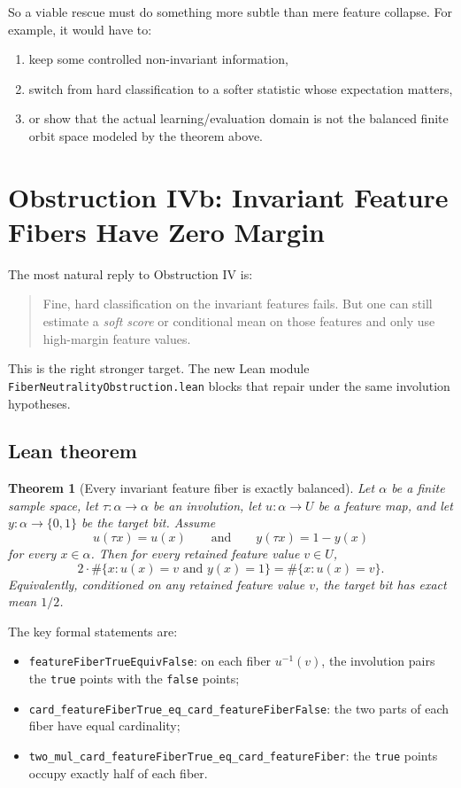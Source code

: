 \documentclass[11pt]{article}
\newtheorem{theorem}{Theorem}[section]
\theoremstyle{remark}
\begin{document}
So a viable rescue must do something more subtle than mere feature collapse.  For example, it
would have to:
\begin{enumerate}[leftmargin=1.5em]
  \item keep some controlled non-invariant information,
  \item switch from hard classification to a softer statistic whose expectation matters,
  \item or show that the actual learning/evaluation domain is not the balanced finite orbit space
  modeled by the theorem above.
\end{enumerate}

\section{Obstruction IVb: Invariant Feature Fibers Have Zero Margin}

The most natural reply to Obstruction IV is:
\begin{quote}
Fine, hard classification on the invariant features fails.  But one can still estimate a
\emph{soft score} or conditional mean on those features and only use high-margin feature values.
\end{quote}

This is the right stronger target.  The new Lean module
\texttt{FiberNeutralityObstruction.lean} blocks that repair under the same involution
hypotheses.

\subsection{Lean theorem}

\begin{theorem}[Every invariant feature fiber is exactly balanced]
Let \(\alpha\) be a finite sample space, let \(\tau : \alpha \to \alpha\) be an involution, let
\(u : \alpha \to U\) be a feature map, and let \(y : \alpha \to \{0,1\}\) be the target bit.
Assume
\[
  u(\tau x) = u(x)
  \qquad\text{and}\qquad
  y(\tau x) = 1 - y(x)
\]
for every \(x \in \alpha\).  Then for every retained feature value \(v \in U\),
\[
  2 \cdot \#\{x : u(x)=v \text{ and } y(x)=1\}
  =
  \#\{x : u(x)=v\}.
\]
Equivalently, conditioned on any retained feature value \(v\), the target bit has exact mean
\(1/2\).
\end{theorem}

\noindent
The key formal statements are:
\begin{itemize}[leftmargin=1.5em]
  \item \texttt{featureFiberTrueEquivFalse}: on each fiber \(u^{-1}(v)\), the involution pairs
  the \texttt{true} points with the \texttt{false} points;
  \item \texttt{card\_featureFiberTrue\_eq\_card\_featureFiberFalse}: the two parts of each fiber
  have equal cardinality;
  \item \texttt{two\_mul\_card\_featureFiberTrue\_eq\_card\_featureFiber}: the \texttt{true}
  points occupy exactly half of each fiber.
\end{itemize}
\end{document}
